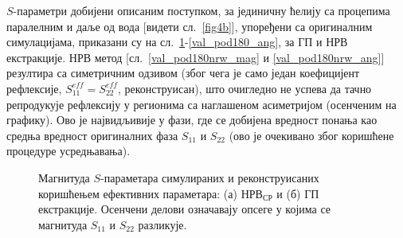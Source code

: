 $S$-параметри добијени описаним поступком, за јединичну ћелију са процепима паралелним и даље од вода [видети сл.~\ref{fig4b}], упоређени са оригиналним симулацијама, приказани су на сл.~\ref{val_pod180_mag}-\ref{val_pod180_ang}, за ГП и НРВ екстракције. НРВ метод [сл.~\ref{val_pod180nrw_mag} и \ref{val_pod180nrw_ang}] резултира са симетричним одзивом (због чега је само један коефицијент рефлексије, $S_{11}^{eff}=S_{22}^{eff}$, реконструисан), што очигледно не успева да тачно репродукује рефлексију у регионима са наглашеном асиметријом (осенченим на графику). Ово је највидљивије у фази, где се добијена вредност понања као средња вредност оригиналних фаза $S_{11}$ и $S_{22}$ (ово је очекивано због коришћене процедуре усредњавања).
\begin{figure}[!t]
\centering
{}
\caption{Магнитуда $S$-параметара симулираних и реконструисаних коришћењем ефективних параметара: (а) $НРВ_{СР}$ и (б) ГП екстракције. Осенчени делови означавају опсеге у којима се магнитуда $S_{11}$ и $S_{22}$ разликује.}
\label{val_pod180_mag}
\end{figure}
